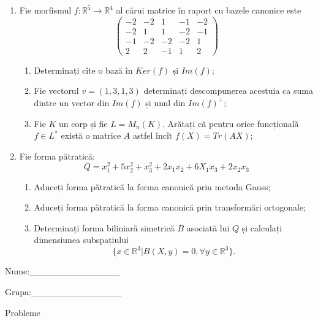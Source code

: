\documentclass{article}
\begin{document}
\begin{enumerate}
 \item Fie morfismul $f:\mathbb{R}^5 \to \mathbb{R}^4$ al cărui matrice în raport cu bazele canonice este
$$\begin{pmatrix}
-2&-2&1&-1&-2\\
-2&1&1&-2&-1\\
-1&-2&-2&-2&1\\
2&2&-1&1&2
\end{pmatrix}$$

\begin{enumerate}
\item Determinați cîte o bază în $Ker(f)$ și $Im(f)$;
\item Fie vectorul $v=(1,3,1,3)$ determinați descompunerea acestuia ca suma dintre un vector din $Im(f)$ și unul din $Im(f)^\perp$;
\item Fie $K$ un corp și fie $L=M_n(K)$. Arătați că pentru orice funcțională $f \in L^*$ există o matrice $A$ astfel încît $f(X)=Tr(AX)$;
\end{enumerate}
\item Fie forma pătratică:
$$Q= x_1^2+5x_2^2+x_3^2+2x_1x_2+6X_1x_3+2x_2x_3$$

\begin{enumerate}
\item Aduceți forma pătratică la forma canonică prin metoda Gauss;
\item Aduceți forma pătratică la forma canonică prin transformări ortogonale;
\item Determinați forma biliniară simetrică $B$ asociată lui $Q$ și calculați dimensiunea subspațiului
$$\{x \in \mathbb{R}^3 | B(X,y)=0,\forall y \in \mathbb{R}^3\}.$$

\end{enumerate}
\end{enumerate}
\newpage
\begin{flushright}
Nume:\_\_\_\_\_\_\_\_\_\_\_\_\_\_
 
 
Grupa:\_\_\_\_\_\_\_\_\_\_\_\_\_\_
\end{flushright}
\begin{center}
\vspace{2cm}
{\Large Probleme}
\vspace{2cm}
\end{center}
\end{document}

